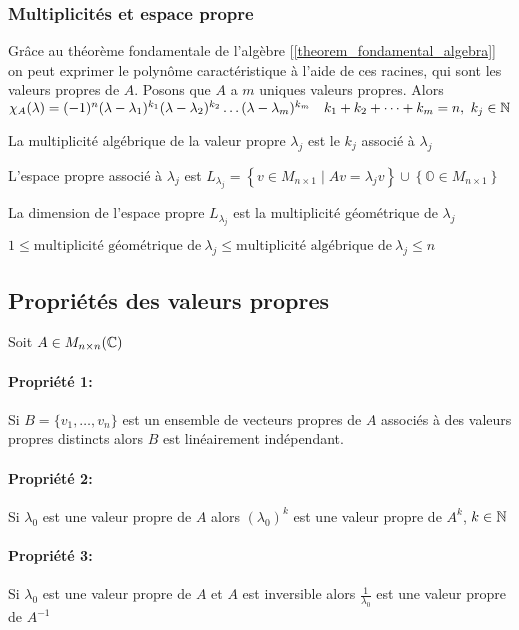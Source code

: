 \subsubsection{Multiplicités et espace propre}
Grâce au théorème fondamentale de l'algèbre [\ref{theorem_fondamental_algebra}] on peut
exprimer le polynôme caractéristique à l'aide de ces racines, qui sont les valeurs propres
de $A$. Posons que $A$ a $m$ uniques valeurs propres. Alors
$\chi_A(\lambda) = (-1)^n(\lambda - \lambda_1)^{k_1}(\lambda - \lambda_2)^{k_2} \dots (\lambda - \lambda_m)^{k_m}
    \quad k_1 + k_2 + \dots + k_m = n, \ k_j \in \mathbb{N}$
\begin{definition}
    La multiplicité algébrique de la valeur propre $\lambda_j$ est le $k_j$ associé à $\lambda_j$
\end{definition}
\begin{definition}
    L'espace propre associé à $\lambda_j$ est
    $L_{\lambda_j} = \left\{ v \in M_{n \times 1} \mid Av = \lambda_j v \right\} \cup \left\{\mathbb{O} \in M_{n \times 1}\right\}$
\end{definition}
\begin{definition}
    La dimension de l'espace propre $L_{\lambda_j}$ est la multiplicité géométrique de $\lambda_j$
\end{definition}
\begin{lemma}
    $1 \leq \text{multiplicité géométrique de} \ \lambda_j \leq \text{multiplicité algébrique de} \ \lambda_j \leq n$
\end{lemma}

\subsection{Propriétés des valeurs propres}
Soit $A \in M_{n \times n}(\mathbb{C})$
\paragraph{Propriété 1:} Si $B = \{v_1, \dots, v_n\}$ est un ensemble de vecteurs propres de $A$
associés à des valeurs propres distincts alors $B$ est linéairement indépendant.
\paragraph{Propriété 2:} Si $\lambda_0$ est une valeur propre de $A$ alors $(\lambda_0)^k$ est une
valeur propre de $A^k$, $k \in \mathbb{N}$
\paragraph{Propriété 3:} Si $\lambda_0$ est une valeur propre de $A$ et $A$ est inversible alors
$\frac{1}{\lambda_0}$ est une valeur propre de $A^{-1}$
